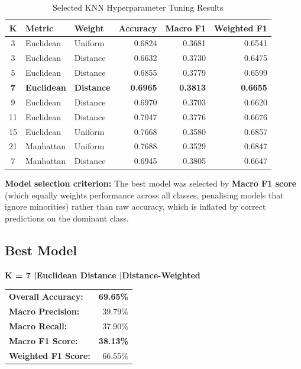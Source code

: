 \documentclass[12pt,a4paper]{article}
\begin{document}
\begin{table}[H]
\centering
\caption{Selected KNN Hyperparameter Tuning Results}
\label{tab:knn_tuning}
\small
\begin{tabular}{c l l r r r}
\toprule
\textbf{K} & \textbf{Metric} & \textbf{Weight} & \textbf{Accuracy} & \textbf{Macro F1} & \textbf{Weighted F1} \\
\midrule
3  & Euclidean & Uniform  & 0.6824 & 0.3681 & 0.6541 \\
3  & Euclidean & Distance & 0.6632 & 0.3730 & 0.6475 \\
5  & Euclidean & Distance & 0.6855 & 0.3779 & 0.6599 \\
\rowcolor{green!10}
\textbf{7}  & \textbf{Euclidean} & \textbf{Distance} & \textbf{0.6965} & \textbf{0.3813} & \textbf{0.6655} \\
9  & Euclidean & Distance & 0.6970 & 0.3703 & 0.6620 \\
11 & Euclidean & Distance & 0.7047 & 0.3776 & 0.6676 \\
15 & Euclidean & Uniform  & 0.7668 & 0.3580 & 0.6857 \\
21 & Manhattan & Uniform  & 0.7688 & 0.3529 & 0.6847 \\
7  & Manhattan & Distance & 0.6945 & 0.3805 & 0.6647 \\
\bottomrule
\end{tabular}
\end{table}

\textbf{Model selection criterion:} The best model was selected by \textbf{Macro F1 score} (which equally weights performance across all classes, penalising models that ignore minorities) rather than raw accuracy, which is inflated by correct predictions on the dominant class.

\subsection{Best Model}

\begin{bestbox}
\begin{center}
{\Large\textbf{K = 7 \quad|\quad Euclidean Distance \quad|\quad Distance-Weighted}}
\end{center}
\vspace{4pt}
\begin{tabular}{l r}
\textbf{Overall Accuracy:} & \textbf{69.65\%} \\
\textbf{Macro Precision:} & 39.79\% \\
\textbf{Macro Recall:} & 37.90\% \\
\textbf{Macro F1 Score:} & \textbf{38.13\%} \\
\textbf{Weighted F1 Score:} & 66.55\% \\
\end{tabular}
\end{bestbox}
\end{document}
